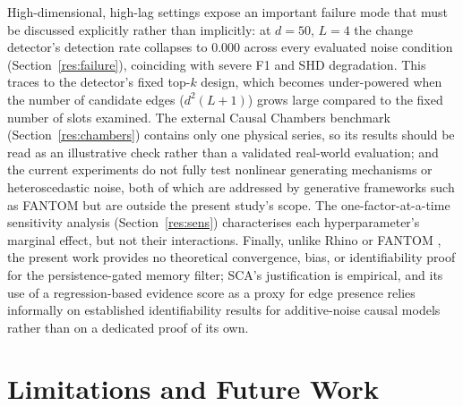 \documentclass{ieeeaccess}
\begin{document}
High-dimensional, high-lag settings expose an important failure mode that must be discussed explicitly rather than implicitly: at $d=50$, $L=4$ the change detector's detection rate collapses to 0.000 across every evaluated noise condition (Section~\ref{res:failure}), coinciding with severe F1 and SHD degradation. This traces to the detector's fixed top-$k$ design, which becomes under-powered when the number of candidate edges ($d^2(L+1)$) grows large compared to the fixed number of slots examined. The external Causal Chambers benchmark (Section~\ref{res:chambers}) contains only one physical series, so its results should be read as an illustrative check rather than a validated real-world evaluation; and the current experiments do not fully test nonlinear generating mechanisms or heteroscedastic noise, both of which are addressed by generative frameworks such as FANTOM \cite{r8} but are outside the present study's scope. The one-factor-at-a-time sensitivity analysis (Section~\ref{res:sens}) characterises each hyperparameter's marginal effect, but not their interactions. Finally, unlike Rhino \cite{r4} or FANTOM \cite{r8}, the present work provides no theoretical convergence, bias, or identifiability proof for the persistence-gated memory filter; SCA's justification is empirical, and its use of a regression-based evidence score as a proxy for edge presence relies informally on established identifiability results for additive-noise causal models \cite{r8,r14} rather than on a dedicated proof of its own.

\section{Limitations and Future Work}
\label{sec:limits}
\end{document}
